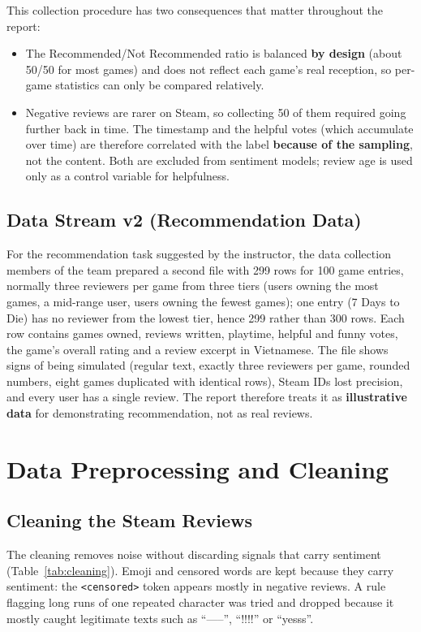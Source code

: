 This collection procedure has two consequences that matter throughout the report:
\begin{itemize}
    \item The Recommended/Not Recommended ratio is balanced \textbf{by design} (about 50/50 for most games) and does not reflect each game's real reception, so per-game statistics can only be compared relatively.
    \item Negative reviews are rarer on Steam, so collecting 50 of them required going further back in time. The timestamp and the helpful votes (which accumulate over time) are therefore correlated with the label \textbf{because of the sampling}, not the content. Both are excluded from sentiment models; review age is used only as a control variable for helpfulness.
\end{itemize}

\subsection{Data Stream v2 (Recommendation Data)}

For the recommendation task suggested by the instructor, the data collection members of the team prepared a second file with 299 rows for 100 game entries, normally three reviewers per game from three tiers (users owning the most games, a mid-range user, users owning the fewest games); one entry (7 Days to Die) has no reviewer from the lowest tier, hence 299 rather than 300 rows. Each row contains games owned, reviews written, playtime, helpful and funny votes, the game's overall rating and a review excerpt in Vietnamese. The file shows signs of being simulated (regular text, exactly three reviewers per game, rounded numbers, eight games duplicated with identical rows), Steam IDs lost precision, and every user has a single review. The report therefore treats it as \textbf{illustrative data} for demonstrating recommendation, not as real reviews.

\section{Data Preprocessing and Cleaning}

\subsection{Cleaning the Steam Reviews}

The cleaning removes noise without discarding signals that carry sentiment (Table~\ref{tab:cleaning}). Emoji and censored words are kept because they carry sentiment: the \texttt{<censored>} token appears mostly in negative reviews. A rule flagging long runs of one repeated character was tried and dropped because it mostly caught legitimate texts such as ``-----'', ``!!!!'' or ``yesss''.

